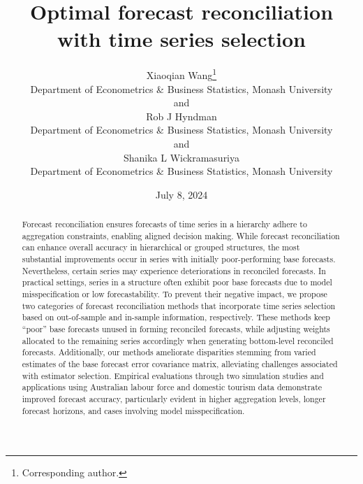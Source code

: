 \documentclass[
  11pt]{article}
\theoremstyle{plain}
\theoremstyle{remark}
\begin{document}
\def\spacingset#1{\renewcommand{\baselinestretch}%
{#1}\small\normalsize} \spacingset{1}

\renewcommand*{\arraystretch}{0.5} %


\date{July 8, 2024}
\title{\bf Optimal forecast reconciliation with time series selection}
\author{
Xiaoqian Wang\thanks{Corresponding author.} \vspace{0.2em}\\
Department of Econometrics \& Business Statistics, Monash
University \vspace{0.2em}\\
and \vspace{0.2em}\\Rob J Hyndman \vspace{0.2em}\\
Department of Econometrics \& Business Statistics, Monash
University \vspace{0.2em}\\
and \vspace{0.2em}\\Shanika L Wickramasuriya \vspace{0.2em}\\
Department of Econometrics \& Business Statistics, Monash
University \vspace{0.2em}\\
}
\maketitle

\bigskip
\bigskip
\begin{abstract}
Forecast reconciliation ensures forecasts of time series in a hierarchy
adhere to aggregation constraints, enabling aligned decision making.
While forecast reconciliation can enhance overall accuracy in
hierarchical or grouped structures, the most substantial improvements
occur in series with initially poor-performing base forecasts.
Nevertheless, certain series may experience deteriorations in reconciled
forecasts. In practical settings, series in a structure often exhibit
poor base forecasts due to model misspecification or low
forecastability. To prevent their negative impact, we propose two
categories of forecast reconciliation methods that incorporate time
series selection based on out-of-sample and in-sample information,
respectively. These methods keep ``poor'' base forecasts unused in
forming reconciled forecasts, while adjusting weights allocated to the
remaining series accordingly when generating bottom-level reconciled
forecasts. Additionally, our methods ameliorate disparities stemming
from varied estimates of the base forecast error covariance matrix,
alleviating challenges associated with estimator selection. Empirical
evaluations through two simulation studies and applications using
Australian labour force and domestic tourism data demonstrate improved
forecast accuracy, particularly evident in higher aggregation levels,
longer forecast horizons, and cases involving model misspecification.
\end{abstract}
\end{document}
